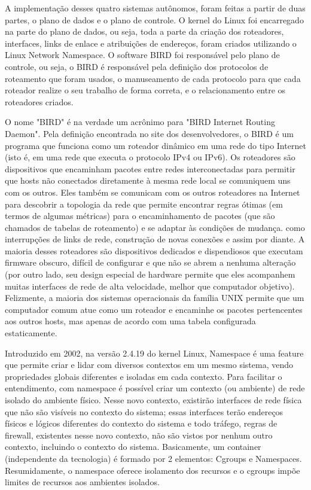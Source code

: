 \documentclass[12pt,a4paper]{report}
\begin{document}
A implementa\c{c}\~ao desses quatro sistemas aut\^onomos, foram feitas a partir de duas partes, o plano de dados e o plano de controle. O kernel do Linux foi encarregado na parte do plano de dados, ou seja, toda a parte da cria\c{c}\~ao dos roteadores, interfaces, links de enlace e atribui\c{c}\~oes de endere\c{c}os, foram criados utilizando o Linux Network Namespace. O software BIRD foi respons\'avel pelo plano de controle, ou seja, o BIRD \'e respons\'avel pela defini\c{c}\~ao dos protocolos de roteamento que foram usados, o manuseamento de cada protocolo para que cada roteador realize o seu trabalho de forma correta, e o relacionamento entre os roteadores criados.

O nome "BIRD" \'e na verdade um acr\^onimo para "BIRD Internet Routing Daemon". Pela defini\c{c}\~ao encontrada no site dos desenvolvedores, o BIRD \'e um programa que funciona como um roteador din\^amico em uma rede do tipo Internet (isto \'e, em uma rede que executa o protocolo IPv4 ou IPv6). Os roteadores s\~ao dispositivos que encaminham pacotes entre redes interconectadas para permitir que hosts n\~ao conectados diretamente \`a mesma rede local se comuniquem uns com os outros. Eles tamb\'em se comunicam com os outros roteadores na Internet para descobrir a topologia da rede que permite encontrar regras \'otimas (em termos de algumas m\'etricas) para o encaminhamento de pacotes (que s\~ao chamados de tabelas de roteamento) e se adaptar \`as condi\c{c}\~oes de mudan\c{c}a. como interrup\c{c}\~oes de links de rede, constru\c{c}\~ao de novas conex\~oes e assim por diante. A maioria desses roteadores s\~ao dispositivos dedicados e dispendiosos que executam firmware obscuro, dif\'icil de configurar e que n\~ao se abrem a nenhuma altera\c{c}\~ao (por outro lado, seu design especial de hardware permite que eles acompanhem muitas interfaces de rede de alta velocidade, melhor que computador objetivo). Felizmente, a maioria dos sistemas operacionais da fam\'ilia UNIX permite que um computador comum atue como um roteador e encaminhe os pacotes pertencentes aos outros hosts, mas apenas de acordo com uma tabela configurada estaticamente.

Introduzido em 2002, na vers\~ao 2.4.19 do kernel Linux, Namespace \'e uma feature que permite criar e lidar com diversos contextos em um mesmo sistema, vendo propriedades globais diferentes e isoladas em cada contexto. Para facilitar o entendimento, com namespace \'e possível criar um contexto (ou ambiente) de rede isolado do ambiente f\'isico. Nesse novo contexto, existir\~ao interfaces de rede f\'isica que n\~ao s\~ao vis\'iveis no contexto do sistema; essas interfaces ter\~ao endere\c{c}os f\'isicos e l\'ogicos diferentes do contexto do sistema e todo tr\'afego, regras de firewall, existentes nesse novo contexto, n\~ao s\~ao vistos por nenhum outro contexto, incluindo o contexto do sistema. Basicamente, um container (independente da tecnologia) \'e formado por 2 elementos: Cgroups e Namespaces. Resumidamente, o namespace oferece isolamento dos recursos e o cgroups imp\~oe limites de recursos aos ambientes isolados.
\end{document}
